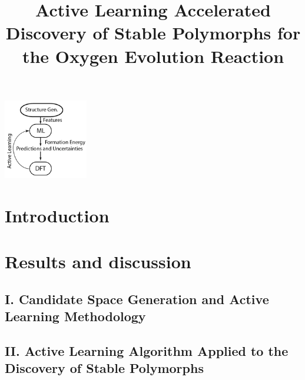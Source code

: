\documentclass[%
  journal=cmatex,  %
  manuscript=article,
  ]{achemso}
\title[ML discovered \IrOx phases]{
Active Learning Accelerated Discovery of Stable \IrOx Polymorphs for the Oxygen Evolution Reaction
}
\begin{document}
\begin{tocentry}
\begin{center}
\includegraphics[height=3.5cm]{02_figures/toc_figure}
\end{center}
\end{tocentry}



\newpage
\begin{abstract}

\end{abstract}
\newpage

\section{Introduction}


\section{Results and discussion}

  \subsection{I. Candidate Space Generation and Active Learning Methodology}
  

  \subsection{II. Active Learning Algorithm Applied to the Discovery of Stable \IrOx Polymorphs}
  

\end{document}
